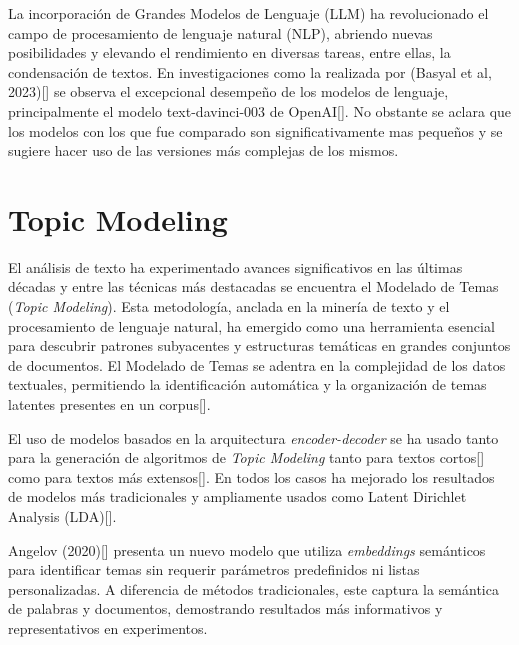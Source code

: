 La incorporación de Grandes Modelos de Lenguaje (LLM) ha revolucionado el campo de procesamiento de lenguaje natural (NLP), abriendo nuevas posibilidades y elevando el rendimiento en diversas tareas, entre ellas, la condensación de textos. En investigaciones como la realizada por (Basyal et al, 2023)[\cite{basyal2023text}] se observa el excepcional desempeño de los modelos de lenguaje, principalmente el modelo text-davinci-003 de OpenAI[\cite{openai}]. No obstante se aclara que los modelos con los que fue comparado son significativamente mas peque\~nos y se sugiere hacer uso de las versiones más complejas de los mismos.

\section{Topic Modeling}

    El análisis de texto ha experimentado avances significativos en las últimas décadas y entre las técnicas más destacadas se encuentra el Modelado de Temas (\emph{Topic Modeling}). Esta metodología, anclada en la minería de texto y el procesamiento de lenguaje natural, ha emergido como una herramienta esencial para descubrir patrones subyacentes y estructuras temáticas en grandes conjuntos de documentos. El Modelado de Temas se adentra en la complejidad de los datos textuales, permitiendo la identificación automática y la organización de temas latentes presentes en un corpus[\cite{lda2003}].

    El uso de modelos basados en la arquitectura \emph{encoder-decoder} se ha usado tanto para la generación de algoritmos de \emph{Topic Modeling }tanto para textos cortos[\cite{neuraltm}] como para textos más extensos[\cite{tminemb}]. En todos los casos ha mejorado los resultados de modelos más tradicionales y ampliamente usados como Latent Dirichlet Analysis (LDA)[\cite{lda2003}].  

    Angelov (2020)[\cite{angelov2020top2vec}] presenta un nuevo modelo que utiliza \emph{embeddings} semánticos para identificar temas sin requerir parámetros predefinidos ni listas personalizadas. A diferencia de métodos tradicionales, este captura la semántica de palabras y documentos, demostrando resultados más informativos y representativos en experimentos.

